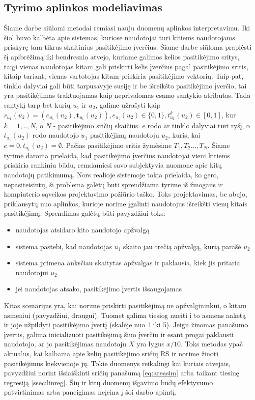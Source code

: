 \documentclass{VUMIFInfMagistrinis}
\begin{document}
\subsection{Tyrimo aplinkos modeliavimas}
\indent
Šiame darbe siūlomi metodai remiasi nauju duomenų aplinkos interpretavimu. Iki šiol buvo kalbėta apie sistemas, kuriose naudotojai turi kitiems naudotojams priskyrę tam tikrus skaitinius pasitikėjimo įverčius. Šiame darbe siūloma praplėsti šį apibrėžimą iki bendresnio atvejo, kuriame galimos kelios pasitikėjimo sritys, taigi vienas naudotojas kitam gali priskirti kelis įverčius pagal pasitikėjimo sritis, kitaip tariant, vienas vartotojas kitam priskiria pasitikėjimo vektorių. Taip pat, tinklo dalyviai gali būti tarpusavyje susiję ir be išreikšto pasitikėjimo įverčio, tai yra pasitikėjimas traktuojamas kaip neprivalomas esamo santykio atributas. Tada santykį tarp bet kurių $u_1$ ir $u_2$, galime užrašyti kaip $r_{u_1}({u_2})=(e_{u_1}({u_2}), \boldsymbol{t}_{u_1}({u_2})), e_{u_1}({u_2}) \in \{0,1\}, t_{u_1}^k({u_2})\in[0,1]$, kur $k=1,..,N$, o $N$ - pasitikėjimo sričių skaičius. $e$ rodo ar tinklo dalyviai turi ryšį, o $t_{u_1}({u_2})$ rodo naudotojo $u_1$ pasitikėjimą naudotoju $u_2$, kuris, kai $e=0, t_{u_1}({u_2}) = \emptyset$. Pačias pasitikėjimo sritis žymėsime $T_1, T_2..., T_N$.
\newline
\indent
Šiame tyrime daroma prielaida, kad pasitikėjimo įverčius naudotojai vieni kitiems priskiria rankiniu būdu, remdamiesi savo subjektyvia nuomone apie kitų naudotojų patikimumą. Nors realioje sistemoje tokia prielaida, ko gero, nepasiteisintų, ši problema galėtų būti sprendžiama tyrime iš žmogaus ir kompiuterio sąveikos projektavimo požiūrio taško. Toks projektavimas, be abejo, priklausytų nuo aplinkos, kurioje norime įgalinti naudotojus išreikšti vienų kitais pasitikėjimą. Sprendimas galėtų būti pavyzdžiui toks: 
\begin{itemize}
	\item naudotojas atsidaro kito naudotojo apžvalgą
	\item sistema pastebi, kad naudotojas $u_1$ skaito jau trečią apžvalgą, kurią parašė $u_2$
	\item sistema primena anksčiau skaitytas apžvalgas ir paklausia, kiek jis pritaria naudotojui $u_2$
	\item jei naudotojas atsako, pasitikėjimo įvertis išsaugojamas
\end{itemize}
\indent
Kitas scenarijus yra, kai norime priskirti pasitikėjimą ne apžvalgininkui, o kitam asmeniui (pavyzdžiui, draugui). Tuomet galima tiesiog nueiti į to asmens anketą ir joje užpildyti pasitikėjimo įvertį (skalėje nuo 1 iki 5).
\indent
Jeigu žinomas panašumo įvertis, galima inicializuoti pasitikėjimą šiuo įverčiu ir esant progai paklausti naudotojo, ar jo pasitikėjimas naudotoju $X$ yra lygus $x/10$. Toks metodas ypač aktualus, kai kalbama apie kelių pasitikėjimo sričių RS ir norime žinoti pasitikėjimus kiekvienoje jų. Tokie duomenys reikalingi kai kuriais atvejais, pavyzdžiui norint išsiaiškinti sričių panašumą \ref{eq:areasim} arba taikant tiesinę regresiją \ref{ssec:linreg}. Šių ir kitų duomenų išgavimo būdų efektyvumo patvirtinimas arba paneigimas neįeina į šoi darbo apimtį.
\end{document}
